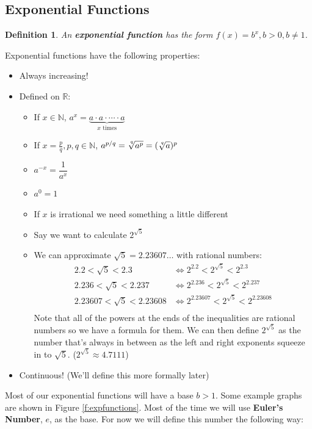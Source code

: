 \documentclass[letterpaper, 11pt, openany]{book}
\theoremstyle{mytheoremstyle}
\newtheorem{definition}{Definition}[section]
\theoremstyle{myexamplestyle}
\begin{document}
\subsection{Exponential Functions}
\begin{definition}\label{d:exponential-function}
    An \textbf{exponential function} has the form $f(x) = b^{x}, b > 0, b \neq 1$.
\end{definition}
Exponential functions have the following properties:
\begin{itemize}
    \item Always increasing!
    \item Defined on $\mathbb{R}$:
    \begin{itemize}
        \item If $x \in \mathbb{N}$, $a^{x} = \underbrace{a \cdot a \cdot \cdots \cdot a}_{x \text{ times}}$
        \item If $x = \frac{p}{q}, p,q \in \mathbb{N}$, $a^{p/q} = \sqrt[\leftroot{-1} \uproot{3} q]{a^{p}} = (\sqrt[\leftroot{-1} \uproot{3} q]{a})^{p}$
        \item $a^{-x} = \dfrac{1}{a^{x}}$
        \item $a^{0} = 1$
        \item If $x$ is irrational we need something a little different
        \item Say we want to calculate $2^{\sqrt{5}}$
        \item We can approximate $\sqrt{5} = 2.23607\ldots$ with rational numbers:
        \begin{align*}
            2.2 < \sqrt{5} < 2.3    &\Leftrightarrow 2^{2.2} < 2^{\sqrt{5}} < 2^{2.3}\\
            2.236 < \sqrt{5} < 2.237    &\Leftrightarrow 2^{2.236} < 2^{\sqrt{5}} < 2^{2.237}\\
            2.23607 < \sqrt{5} < 2.23608    &\Leftrightarrow 2^{2.23607} < 2^{\sqrt{5}} < 2^{2.23608}\\ 
        \end{align*}
        Note that all of the powers at the ends of the inequalities are rational numbers so we have a formula for them. We can then define $2^{\sqrt{5}}$ as the number that's always in between as the left and right exponents squeeze in to $\sqrt{5}$. ($2^{\sqrt{5}} \approx 4.7111$)
    \end{itemize}
    \item Continuous! (We'll define this more formally later)
\end{itemize}
Most of our exponential functions will have a base $b > 1$. Some example graphs are shown in Figure \ref{f:expfunctions}. Most of the time we will use \textbf{Euler's Number}, $e$, as the base. For now we will define this number the following way:
\end{document}
